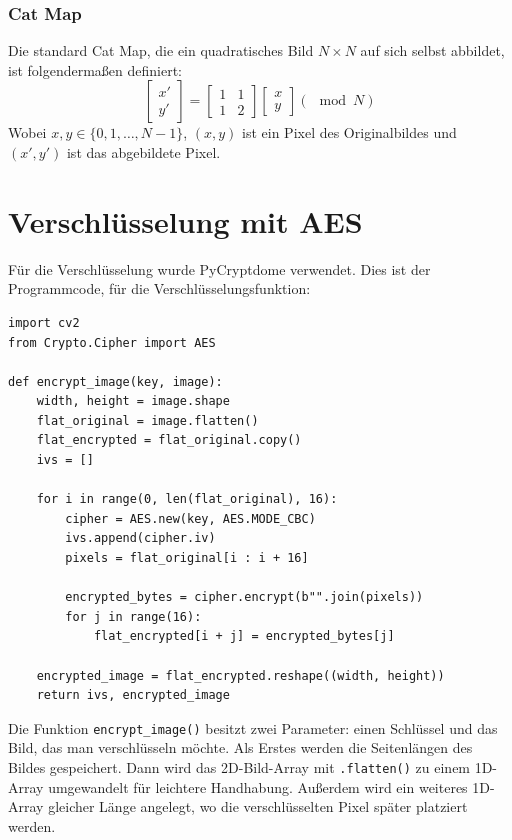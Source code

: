 \subsubsection{Cat Map}
Die standard Cat Map, die ein quadratisches Bild $N \times N$ auf sich selbst abbildet, ist folgendermaßen definiert:
$$
	\begin{bmatrix} x' \\ y' \end{bmatrix} =
	\begin{bmatrix} 1 & 1 \\ 1 & 2 \end{bmatrix}
	\begin{bmatrix} x \\ y \end{bmatrix} (\mod N)
$$
Wobei $x, y \in \{0, 1, \dots , N - 1 \}$, $(x, y)$ ist ein Pixel des Originalbildes und $(x', y')$ ist das abgebildete Pixel.
\cite{catmap}

\section{Verschlüsselung mit AES}
Für die Verschlüsselung wurde PyCryptdome verwendet.
Dies ist der Programmcode, für die Verschlüsselungsfunktion:
\begin{lstlisting}
import cv2
from Crypto.Cipher import AES

def encrypt_image(key, image):
    width, height = image.shape
    flat_original = image.flatten()
    flat_encrypted = flat_original.copy()
    ivs = []

    for i in range(0, len(flat_original), 16):
        cipher = AES.new(key, AES.MODE_CBC)
        ivs.append(cipher.iv)
        pixels = flat_original[i : i + 16]

        encrypted_bytes = cipher.encrypt(b"".join(pixels))
        for j in range(16):
            flat_encrypted[i + j] = encrypted_bytes[j]

    encrypted_image = flat_encrypted.reshape((width, height))
    return ivs, encrypted_image
\end{lstlisting}
Die Funktion \lstinline{encrypt_image()} besitzt zwei Parameter: einen Schlüssel und das Bild,
das man verschlüsseln möchte. Als Erstes werden die Seitenlängen des Bildes gespeichert. Dann wird das 2D-Bild-Array
mit \lstinline{.flatten()} zu einem 1D-Array umgewandelt für leichtere Handhabung. Außerdem wird ein weiteres 1D-Array
gleicher Länge angelegt, wo die verschlüsselten Pixel später platziert werden.


